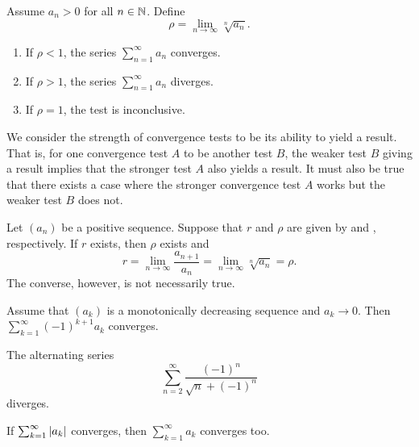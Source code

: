 \begin{proposition}
  Assume $a_n > 0$ for all $n \in \mathbb N$. Define
  \[ \rho = \lim_{n \to \infty} \sqrt[n]{a_n}. \]
  \begin{enumerate}
    \item If $\rho < 1$, the series $\sum_{n = 1}^{\infty} a_n$ converges.
    \item If $\rho > 1$, the series $\sum_{n = 1}^{\infty} a_n$ diverges.
    \item If $\rho = 1$, the test is inconclusive.
  \end{enumerate}
\end{proposition}

\begin{definition}
  We consider the strength of convergence tests to be its ability to
  yield a result. That is, for one convergence test $A$ to be
   another test $B$, the weaker test $B$
  giving a result implies that the stronger test $A$ also yields a
  result. It must also be true that there exists a case where the
  stronger convergence test $A$ works but the weaker test $B$ does not.
\end{definition}

\begin{proposition}
  Let $(a_n)$ be a positive sequence. Suppose that $r$ and $\rho$ are
  given by  and , respectively.
  If $r$ exists, then $\rho$ exists and
  \[ r = \lim_{n \to \infty} \frac{a_{n + 1}}{a_n} = \lim_{n \to
  \infty} \sqrt[n]{a_n} = \rho. \]
  The converse, however, is not necessarily true.
\end{proposition}

\begin{proposition}
  Assume that $(a_k)$ is a monotonically decreasing sequence and $a_k
  \to 0$. Then $\sum_{k = 1}^{\infty} (-1)^{k + 1} a_k$ converges.
\end{proposition}

\begin{example}
  The alternating series
  \[ \sum_{n = 2}^{\infty} \frac{(-1)^n}{\sqrt{n} + (-1)^n} \]
  diverges.
\end{example}

\begin{proposition}
  If $\sum_{k = 1}^{\infty} | a_k |$ converges, then $\sum_{k =
  1}^{\infty} a_k$ converges too.
\end{proposition}

